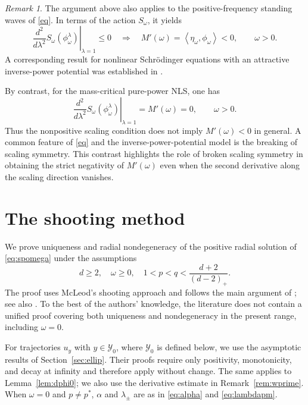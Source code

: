 \documentclass[12pt, a4paper, reqno]{amsart}
\numberwithin{equation}{section}
\theoremstyle{definition}
\theoremstyle{remark}
\newtheorem{remark}[theorem]{Remark}
\def\tbra[#1,#2]{{\left\langle #1,#2\right\rangle}}
\begin{document}
\begin{remark}
\label{rem:scaling}
The argument above also applies to the positive-frequency
standing waves of \eqref{eq}. In terms of the action $S_\omega$, it yields
\[
  \left.\frac{d^2}{d\lambda^2}
  S_\omega(\phi_\omega^\lambda)\right|_{\lambda=1}
  \le0
  \quad\Longrightarrow\quad
  M'(\omega)=\tbra[\eta_\omega,\phi_\omega]<0,
  \qquad \omega>0.
\]
A corresponding result for nonlinear Schr\"odinger equations with
an attractive inverse-power potential was established in
\cite[Proposition~5.5]{F21}.

By contrast, for the mass-critical pure-power NLS, one has
\[
  \left.\frac{d^2}{d\lambda^2}
  S_\omega(\phi_\omega^\lambda)\right|_{\lambda=1}
  =M'(\omega)=0,
  \qquad \omega>0.
\]
Thus the nonpositive scaling condition does not imply
$M'(\omega)<0$ in general. A common feature of \eqref{eq} and the inverse-power-potential model is the breaking of scaling symmetry. This contrast highlights the role of broken scaling symmetry in
obtaining the strict negativity of $M'(\omega)$ even when the
second derivative along the scaling direction vanishes.
\end{remark}



\appendix
\section{The shooting method}\label{app:shoot}

We prove uniqueness and radial nondegeneracy of the positive radial solution
of \eqref{eq:spomega} under the assumptions
\[
  d\ge2,\quad \omega\ge0,\quad
  1<p<q<\frac{d+2}{(d-2)_+}.
\]
The proof uses McLeod's shooting approach \cite{M93} and follows the main argument
of \cite{F13}; see also \cite{T06, KOPV17, LN20}. To the best of the authors'
knowledge, the literature does not contain a unified proof covering both
uniqueness and nondegeneracy in the present range, including $\omega=0$.

For trajectories $u_y$ with $y\in \mathcal Y_0$, where $\mathcal Y_0$ is defined below,
we use the asymptotic results of
Section~\ref{sec:ellip}. Their proofs require only positivity, monotonicity,
and decay at infinity and therefore apply without change. The same applies
to Lemma~\ref{lem:dphi0}; we also use the derivative estimate in
Remark~\ref{rem:wprime}. When $\omega=0$ and $p\ne p^*$, $\alpha$ and
$\lambda_\pm$ are as in \eqref{eq:alpha} and \eqref{eq:lambdapm}.
\end{document}

